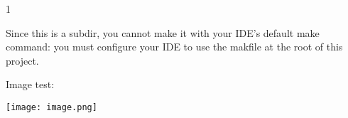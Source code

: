 \documentclass[12pt]{article}
\begin{document}
1

Since this is a subdir, you cannot make it with your IDE's default make command:
you must configure your IDE to use the makfile at the root of this project.

Image test:

\texttt{[image: image.png]}
\end{document}
